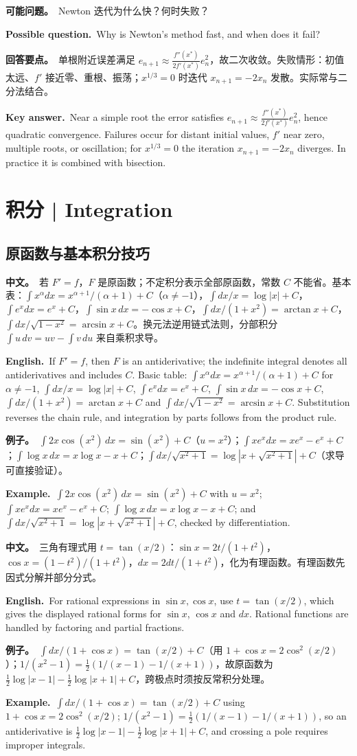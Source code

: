 \documentclass[UTF8,11pt,a4paper]{ctexart}
\newcommand{\BOTH}[2]{\par\noindent\textbf{中文。}\ #1\par\noindent\textbf{English.}\ #2\par}
\newcommand{\EX}[2]{\par\noindent\textbf{例子。}\ #1\par\noindent\textbf{Example.}\ #2\par}
\newcommand{\ASK}[4]{\begin{samepage}\par\noindent\textbf{可能问题。}\ #1\par\noindent\textbf{Possible question.}\ #2\par\noindent\textbf{回答要点。}\ #3\par\noindent\textbf{Key answer.}\ #4\medskip\end{samepage}}
\begin{document}
\ASK{Newton 迭代为什么快？何时失败？}{Why is Newton's method fast, and when does it fail?}{单根附近误差满足 $e_{n+1}\approx\frac{f''(x^*)}{2f'(x^*)}e_n^2$，故二次收敛。失败情形：初值太远、$f'$ 接近零、重根、振荡；$x^{1/3}=0$ 时迭代 $x_{n+1}=-2x_n$ 发散。实际常与二分法结合。}{Near a simple root the error satisfies $e_{n+1}\approx\frac{f''(x^*)}{2f'(x^*)}e_n^2$, hence quadratic convergence. Failures occur for distant initial values, $f'$ near zero, multiple roots, or oscillation; for $x^{1/3}=0$ the iteration $x_{n+1}=-2x_n$ diverges. In practice it is combined with bisection.}

\section{积分 | Integration}
\subsection{原函数与基本积分技巧}
\BOTH{若 $F'=f$，$F$ 是原函数；不定积分表示全部原函数，常数 $C$ 不能省。基本表：$\int x^\alpha dx=x^{\alpha+1}/(\alpha+1)+C$（$\alpha\ne-1$），$\int dx/x=\log|x|+C$，$\int e^x dx=e^x+C$，$\int\sin x\,dx=-\cos x+C$，$\int dx/(1+x^2)=\arctan x+C$，$\int dx/\sqrt{1-x^2}=\arcsin x+C$。换元法逆用链式法则，分部积分 $\int u\,dv=uv-\int v\,du$ 来自乘积求导。}{If $F'=f$, then $F$ is an antiderivative; the indefinite integral denotes all antiderivatives and includes $C$. Basic table: $\int x^\alpha dx=x^{\alpha+1}/(\alpha+1)+C$ for $\alpha\ne-1$, $\int dx/x=\log|x|+C$, $\int e^x dx=e^x+C$, $\int\sin x\,dx=-\cos x+C$, $\int dx/(1+x^2)=\arctan x+C$ and $\int dx/\sqrt{1-x^2}=\arcsin x+C$. Substitution reverses the chain rule, and integration by parts follows from the product rule.}
\EX{$\int2x\cos(x^2)\,dx=\sin(x^2)+C$（$u=x^2$）；$\int xe^x dx=xe^x-e^x+C$；$\int\log x\,dx=x\log x-x+C$；$\int dx/\sqrt{x^2+1}=\log|x+\sqrt{x^2+1}|+C$（求导可直接验证）。}{$\int2x\cos(x^2)\,dx=\sin(x^2)+C$ with $u=x^2$; $\int xe^x dx=xe^x-e^x+C$; $\int\log x\,dx=x\log x-x+C$; and $\int dx/\sqrt{x^2+1}=\log|x+\sqrt{x^2+1}|+C$, checked by differentiation.}
\BOTH{三角有理式用 $t=\tan(x/2)$：$\sin x=2t/(1+t^2)$，$\cos x=(1-t^2)/(1+t^2)$，$dx=2dt/(1+t^2)$，化为有理函数。有理函数先因式分解并部分分式。}{For rational expressions in $\sin x,\cos x$, use $t=\tan(x/2)$, which gives the displayed rational forms for $\sin x$, $\cos x$ and $dx$. Rational functions are handled by factoring and partial fractions.}
\EX{$\int dx/(1+\cos x)=\tan(x/2)+C$（用 $1+\cos x=2\cos^2(x/2)$）；$1/(x^2-1)=\frac12(1/(x-1)-1/(x+1))$，故原函数为 $\frac12\log|x-1|-\frac12\log|x+1|+C$，跨极点时须按反常积分处理。}{$\int dx/(1+\cos x)=\tan(x/2)+C$ using $1+\cos x=2\cos^2(x/2)$; $1/(x^2-1)=\frac12(1/(x-1)-1/(x+1))$, so an antiderivative is $\frac12\log|x-1|-\frac12\log|x+1|+C$, and crossing a pole requires improper integrals.}
\end{document}
